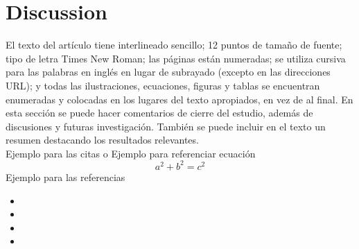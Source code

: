 \section{Discussion}
\label{sec:5}
El texto del artículo tiene interlineado sencillo; 12 puntos de tamaño de fuente; tipo de letra Times New Roman; las páginas están numeradas; se utiliza cursiva para las palabras en inglés en lugar de subrayado (excepto en las direcciones URL); y todas las ilustraciones, ecuaciones, figuras y tablas se encuentran enumeradas y colocadas en los lugares del texto apropiados, en vez de al final.
En esta sección se puede hacer comentarios de cierre del estudio, además de discusiones y futuras investigación. También se puede incluir en el texto un resumen destacando los resultados relevantes.
\\
Ejemplo para las citas \cite{einstein} o \cite{knuthwebsite,latexcompanion}
Ejemplo para referenciar ecuación 
\begin{equation}
    \label{ecuacion:circulo}
    a^2 + b^2 = c^2
\end{equation}
Ejemplo para las referencias 
\begin{itemize}
    \item {}
    \item {}
    \item {}
    \item {}
\end{itemize}